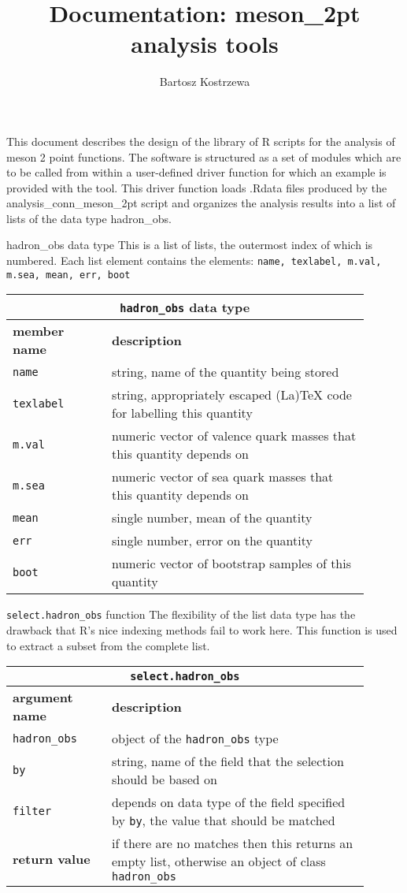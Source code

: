\documentclass[10pt,a4paper]{article}
\author{Bartosz Kostrzewa}
\title{Documentation: meson\_2pt analysis tools}
\begin{document}
This document describes the design of the library of R scripts for the analysis
of meson 2 point functions. The software is structured as a set of modules which
are to be called from within a user-defined driver function for which an example
is provided with the tool. This driver function loads .Rdata files produced by
the {\ttfamily analysis\_conn\_meson\_2pt} script and organizes the analysis
results into a list of lists of the data type {\ttfamily hadron\_obs}.

\begin{section}{{\ttfamily hadron\_obs} data type}
This is a list of lists, the outermost index of which is numbered. Each list
element contains the elements: {\tt name, texlabel, m.val, m.sea, mean, err,
boot}

{ \centering
\begin{tabular}{|p{0.25\linewidth}|p{0.65\linewidth}|}
\hline
\multicolumn{2}{|c|}{ {\tt hadron\_obs} data type } \\
\hline \hline \textbf{member name} & \textbf{description} \\ \hline
{\tt name} & string, name of the quantity being stored \\ 
{\tt texlabel}  & string, appropriately escaped (La)TeX code for labelling this
quantity  \\ 
{\tt m.val} & numeric vector of valence quark masses that this quantity depends
on \\
{\tt m.sea} & numeric vector of sea quark masses that this quantity depends on
\\
{\tt mean} & single number, mean of the quantity \\
{\tt err} & single number, error on the quantity \\
{\tt boot} & numeric vector of bootstrap samples of this quantity \\
\hline 
\end{tabular}
} %

\begin{subsection}{{\tt select.hadron\_obs} function}
The flexibility of the list data type has the drawback that R's nice indexing
methods fail to work here. This function is used to extract a subset from the
complete list.

{ \centering
\begin{tabular}{|p{0.25\linewidth}|p{0.65\linewidth}|}
\hline
\multicolumn{2}{|c|}{ {\tt select.hadron\_obs} } \\
\hline \hline \textbf{argument name} & \textbf{description} \\
\hline {\tt hadron\_obs} & object of the {\tt hadron\_obs} type \\ 
{\tt by} & string, name of the field that the selection should be based on \\ 
{\tt filter} & depends on data type of the field specified by {\tt by}, the
value that should be matched \\ 
\hline \hline
\textbf{return value} & if there are no matches then this returns an empty list,
otherwise an object of class {\tt hadron\_obs} \\
\hline
\end{tabular}
} %


\end{subsection}
\end{section}
\end{document}
